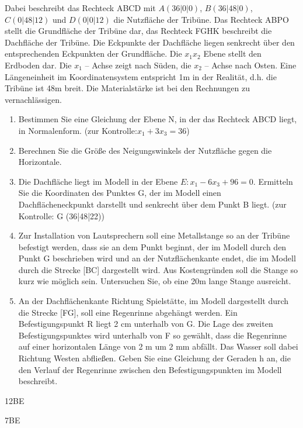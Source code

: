 \documentclass[a4paper,12pt]{article}
\begin{document}
Dabei beschreibt das Rechteck ABCD mit
  $A (36|0|0)$, $ B (36|48|0)$, $C (0|48|12)$ und $ D (0|0|12) $
die Nutzfläche der Tribüne. Das Rechteck ABPO stellt die Grundfläche der Tribüne dar, das
Rechteck FGHK beschreibt die Dachfläche der Tribüne. Die Eckpunkte der Dachfläche liegen
senkrecht über den entsprechenden Eckpunkten der Grundfläche.
Die $x_1x_2 $  Ebene stellt den Erdboden dar. Die $ x_1$ – Achse zeigt nach Süden, die $x_2$ – Achse nach
Osten. Eine Längeneinheit im Koordinatensystem entspricht 1m in der Realität, d.h. die Tribüne ist
48m breit. Die Materialstärke ist bei den Rechnungen zu vernachlässigen.
\begin{enumerate}[label={\alph*)}]
\item  Bestimmen Sie eine Gleichung der Ebene N, in der das Rechteck ABCD liegt, in
Normalenform. (zur Kontrolle:$ x_1 + 3x_3 = 36 $)
\item Berechnen Sie die Größe des Neigungswinkels der Nutzfläche gegen die Horizontale.
\item Die Dachfläche liegt im Modell in der Ebene $E: x_1 - 6x_3 + 96 = 0.$
Ermitteln Sie die Koordinaten des Punktes G, der im Modell einen Dachflächeneckpunkt
darstellt und senkrecht über dem Punkt B liegt. (zur Kontrolle: G (36|48|22))
\item Zur Installation von Lautsprechern soll eine Metallstange so an der Tribüne befestigt
werden, dass sie an dem Punkt beginnt, der im Modell durch den Punkt G beschrieben wird
und an der Nutzflächenkante endet, die im Modell durch die Strecke [BC] dargestellt wird.
Aus Kostengründen soll die Stange so kurz wie möglich sein. Untersuchen Sie, ob eine 20m
lange Stange ausreicht.
\item An der Dachflächenkante Richtung Spielstätte, im Modell dargestellt durch die Strecke
[FG], soll eine Regenrinne abgehängt werden. Ein Befestigungspunkt R liegt 2 cm
unterhalb von G. Die Lage des zweiten Befestigungspunktes wird unterhalb von F so
gewählt, dass die Regenrinne auf einer horizontalen Länge von 2 m um 2 mm abfällt. Das
Wasser soll dabei Richtung Westen abfließen. Geben Sie eine Gleichung der Geraden h an,
die den Verlauf der Regenrinne zwischen den Befestigungspunkten im Modell beschreibt.
\end{enumerate}


\begin{flushright}12BE \end{flushright}




\begin{flushright}7BE \end{flushright}


\end{document}
